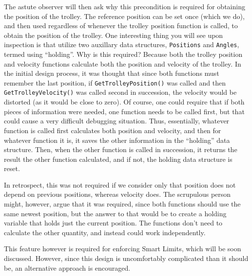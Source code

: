 \documentclass[letterpaper]{article}
\begin{document}
The astute observer will then ask why this precondition is required for obtaining the position of the trolley. The reference position can be set once (which we do), and then used regardless of whenever the trolley position function is called, to obtain the position of the trolley. One interesting thing you will see upon inspection is that utilize two auxillary data structures, \texttt{Positions} and \texttt{Angles}, termed using ``holding''. Why is this required? Because both the trolley position and velocity functions calculate both the position and velocity of the trolley. In the initial design process, it was thought that since both functions must remember the last position, if \texttt{GetTrolleyPosition()} was called and then \texttt{GetTrolleyVelocity()} was called second in succession, the velocity would be distorted (as it would be close to zero). Of course, one could require that if both pieces of information were needed, one function needs to be called first, but that could cause a very difficult debugging situation. Thus, essentially, whatever function is called first calculates both position and velocity, and then for whatever function it is, it saves the other information in the ``holding'' data structure. Then, when the other function is called in succession, it returns the result the other function calculated, and if not, the holding data structure is reset.

\begin{tcolorbox}[colframe=blue!50!black!70,title=Future Modification]
    In retrospect, this was not required if we consider only that position does not depend on previous positions, whereas velocity does. The scrupulous person might, however, argue that it was required, since both functions should use the same newest position, but the answer to that would be to create a holding variable that holds just the current position. The functions don't need to calculate the other quantity, and instead could work independently.

    This feature however is required for enforcing Smart Limits, which will be soon discussed. However, since this design is uncomfortably complicated than it should be, an alternative approach is encouraged.
\end{tcolorbox}
\end{document}
